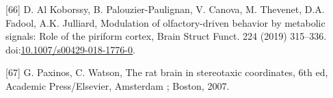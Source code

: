 \documentclass[man]{apa6}
\begin{document}
\leavevmode\hypertarget{ref-alkoborssyModulationOlfactorydrivenBehavior2019}{}%
{[}66{]} D. Al Koborssy, B. Palouzier-Paulignan, V. Canova, M. Thevenet, D.A. Fadool, A.K. Julliard, Modulation of olfactory-driven behavior by metabolic signals: Role of the piriform cortex, Brain Struct Funct. 224 (2019) 315--336. doi:\href{https://doi.org/10.1007/s00429-018-1776-0}{10.1007/s00429-018-1776-0}.

\leavevmode\hypertarget{ref-paxinosRatBrainStereotaxic2007}{}%
{[}67{]} G. Paxinos, C. Watson, The rat brain in stereotaxic coordinates, 6th ed, Academic Press/Elsevier, Amsterdam ; Boston, 2007.

\pagebreak
\end{document}
